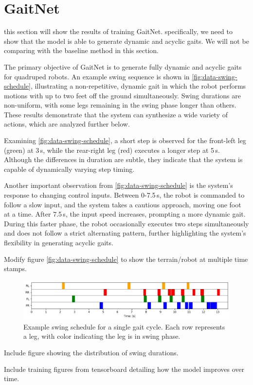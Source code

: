 \section{GaitNet}
\label{sec:gaitnet}

\begin{todo}
  this section will show the results of training GaitNet.
  specifically, we need to show that the model is able to generate
  dynamic and acyclic gaits. We will not be comparing with the
  baseline   method in this section.
\end{todo}

The primary objective of GaitNet is to generate fully dynamic and
acyclic gaits for quadruped robots. An example swing sequence is
shown in \autoref{fig:data-swing-schedule}, illustrating a
non-repetitive, dynamic gait in which the robot performs motions with
up to two feet off the ground simultaneously. Swing durations are
non-uniform, with some legs remaining in the swing phase longer than
others. These results demonstrate that the system can synthesize a
wide variety of actions, which are analyzed further below.

Examining \autoref{fig:data-swing-schedule}, a short step is observed
for the front-left leg (green) at 3\,s, while the rear-right leg
(red) executes a longer step at 5\,s. Although the differences in
duration are subtle, they indicate that the system is capable of
dynamically varying step timing.

Another important observation from \autoref{fig:data-swing-schedule}
is the system's response to changing control inputs. Between
0-7.5\,s, the robot is commanded to follow a slow input, and the
system takes a cautious approach, moving one foot at a time. After
7.5\,s, the input speed increases, prompting a more dynamic gait.
During this faster phase, the robot occasionally executes two steps
simultaneously and does not follow a strict alternating pattern,
further highlighting the system's flexibility in generating acyclic gaits.

\begin{todo}
  Modify figure \autoref{fig:data-swing-schedule} to show   the
  terrain/robot at multiple time stamps.
\end{todo}

\begin{figure}[H]
  \centering
  \includegraphics[width=\textwidth]{images/data/swing-schedule.png}
  \caption{Example swing schedule for a single gait cycle. Each row
  represents a leg, with color indicating the leg is in swing phase.}
  \label{fig:data-swing-schedule}
\end{figure}

\begin{todo}
  Include figure showing the distribution of swing durations.
\end{todo}

\begin{todo}
  Include training figures from tensorboard detailing how the model
  improves over time.
\end{todo}
